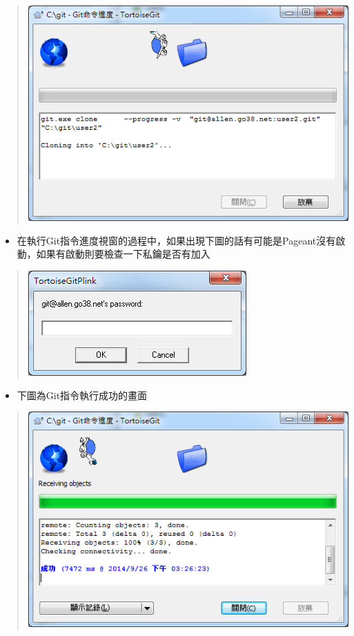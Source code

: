 \documentclass[letterpaper,10pt,english]{sphinxmanual}
\begin{document}
\begin{quote}

\includegraphics{tortoisegit-clone-004.png}
\end{quote}
\begin{itemize}
\item {} 
在執行Git指令進度視窗的過程中，如果出現下圖的話有可能是Pageant沒有啟動，如果有啟動則要檢查一下私鑰是否有加入

\end{itemize}
\begin{quote}

\includegraphics{tortoisegit-clone-005.png}
\end{quote}
\begin{itemize}
\item {} 
下圖為Git指令執行成功的畫面

\end{itemize}
\begin{quote}

\includegraphics{tortoisegit-clone-006.png}
\end{quote}
\end{document}
